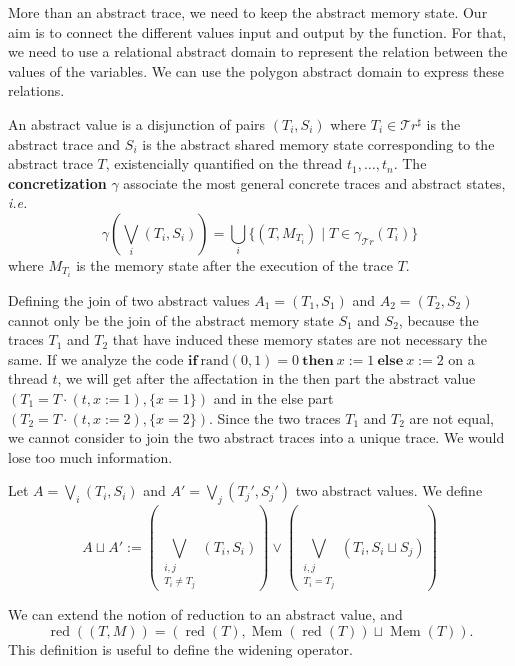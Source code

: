 \documentclass[runningheads]{llncs}
\newcommand{\ifinst}{\mathbf{if}}
\newcommand{\theninst}{\mathbf{then}}
\newcommand{\elseinst}{\mathbf{else}}
\newcommand{\Traces}{\mathcal T\!r}
\newcommand{\aTraces}{\mathcal T\!r^\sharp}
\DeclareMathOperator{\red}{red}
\DeclareMathOperator{\Mem}{Mem}
\begin{document}
More than an abstract trace, we need to keep the abstract memory state. Our aim is to connect the different values input and output by the function. For that, we need to use a relational abstract domain to represent the relation between the values of the variables. We can use the polygon abstract domain \cite{DBLP:journals/lisp/Mine06} to express these relations. 



\begin{definition}
	An abstract value is a disjunction of pairs $(T_i, S_i)$ where $T_i \in \aTraces$ is the abstract trace and $S_i$ is the abstract shared memory state corresponding to the abstract trace $T$, existencially quantified on the thread $t_1, \dots, t_n$. The \textbf{concretization} $\gamma$ associate the most general concrete traces and abstract states, \emph{i.e.}
	\[\gamma\left(\bigvee_i (T_i, S_i)\right) = \bigcup_i \{ (T, M_{T_i}) \mid T\in\gamma_{\Traces}(T_i) \}\]
	where $M_{T_i}$ is the memory state after the execution of the trace $T$. 
\end{definition}





Defining the join of two abstract values $A_1 = (T_1, S_1)$ and $A_2 = (T_2, S_2)$ cannot only be the join of the abstract memory state $S_1$ and $S_2$, because the traces $T_1$ and $T_2$ that have induced these memory states are not necessary the same. If we analyze the code $\ifinst\ \mathrm{rand}(0,1) = 0\ \theninst \ x := 1 \ \elseinst \ x :=2$ on a thread $t$, we will get after the affectation in the then part the abstract value $(T_1 = T \cdot (t, x:=1), \{x = 1\})$ and in the else part $(T_2 = T \cdot (t, x:= 2), \{x = 2\})$. Since the two traces $T_1$ and $T_2$ are not equal, we cannot consider to join the two abstract traces into a unique trace. We would lose too much information. 


\begin{definition}[Join]
	Let $A = \bigvee_i (T_i, S_i)$ and $A' = \bigvee_j (T_j', S_j')$ two abstract values. We define
	\[A \sqcup A' := \left(\bigvee_{\substack{i,j\\T_i \neq T_j}} (T_i, S_i) \right) \vee \left(\bigvee_{\substack{i,j \\ T_i = T_j}} (T_i, S_i \sqcup S_j) \right)\]
\end{definition}



We can extend the notion of reduction to an abstract value, and \[\red((T, M)) = (\red(T), \Mem(\red(T)) \sqcup \Mem(T)).\] 
This definition is useful to define the widening operator. 
\end{document}
